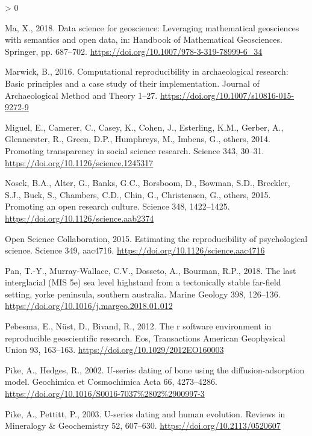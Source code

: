 \documentclass[]{elsarticle} %
\newlength{\cslhangindent}
\newenvironment{CSLReferences}[2] %
 {%
  \setlength{\parindent}{0pt}
  \ifodd #1 \everypar{\setlength{\hangindent}{\cslhangindent}}\ignorespaces\fi
  \ifnum #2 > 0
  \setlength{\parskip}{#2\baselineskip}
  \fi
 }%
 {}
\begin{document}
\begin{CSLReferences}{1}{0}
\leavevmode\hypertarget{ref-ma2018data}{}%
Ma, X., 2018. Data science for geoscience: Leveraging mathematical geosciences with semantics and open data, in: Handbook of Mathematical Geosciences. Springer, pp. 687--702. \url{https://doi.org/10.1007/978-3-319-78999-6_34}

\leavevmode\hypertarget{ref-Marwick2016repro}{}%
Marwick, B., 2016. Computational reproducibility in archaeological research: Basic principles and a case study of their implementation. Journal of Archaeological Method and Theory 1--27. \url{https://doi.org/10.1007/s10816-015-9272-9}

\leavevmode\hypertarget{ref-miguel2014promoting}{}%
Miguel, E., Camerer, C., Casey, K., Cohen, J., Esterling, K.M., Gerber, A., Glennerster, R., Green, D.P., Humphreys, M., Imbens, G., others, 2014. Promoting transparency in social science research. Science 343, 30--31. \url{https://doi.org/10.1126/science.1245317}

\leavevmode\hypertarget{ref-nosek2015promoting}{}%
Nosek, B.A., Alter, G., Banks, G.C., Borsboom, D., Bowman, S.D., Breckler, S.J., Buck, S., Chambers, C.D., Chin, G., Christensen, G., others, 2015. Promoting an open research culture. Science 348, 1422--1425. \url{https://doi.org/10.1126/science.aab2374}

\leavevmode\hypertarget{ref-open2015estimating}{}%
Open Science Collaboration, 2015. Estimating the reproducibility of psychological science. Science 349, aac4716. \url{https://doi.org/10.1126/science.aac4716}

\leavevmode\hypertarget{ref-RN5108}{}%
Pan, T.-Y., Murray-Wallace, C.V., Dosseto, A., Bourman, R.P., 2018. The last interglacial (MIS 5e) sea level highstand from a tectonically stable far-field setting, yorke peninsula, southern australia. Marine Geology 398, 126--136. \url{https://doi.org/10.1016/j.margeo.2018.01.012}

\leavevmode\hypertarget{ref-Pebesma_Nust_Bivand_2012}{}%
Pebesma, E., Nüst, D., Bivand, R., 2012. The r software environment in reproducible geoscientific research. Eos, Transactions American Geophysical Union 93, 163--163. \url{https://doi.org/10.1029/2012EO160003}

\leavevmode\hypertarget{ref-RN2996}{}%
Pike, A., Hedges, R., 2002. U-series dating of bone using the diffusion-adsorption model. Geochimica et Cosmochimica Acta 66, 4273--4286. \url{https://doi.org/10.1016/S0016-7037\%2802\%2900997-3}

\leavevmode\hypertarget{ref-Pike2003UseriesDA}{}%
Pike, A., Pettitt, P., 2003. U-series dating and human evolution. Reviews in Mineralogy \& Geochemistry 52, 607--630. \url{https://doi.org/10.2113/0520607}


\end{CSLReferences}
\end{document}
